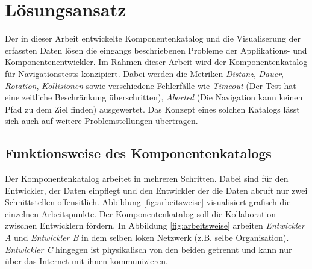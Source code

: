 \chapter{Lösungsansatz}
Der in dieser Arbeit entwickelte Komponentenkatalog und die Visualiserung der erfassten Daten lösen die eingangs beschriebenen Probleme der Applikations- und Komponentenentwickler. Im Rahmen dieser Arbeit wird der Komponentenkatalog für Navigationstests konzipiert. Dabei werden die Metriken \emph{Distanz}, \emph{Dauer}, \emph{Rotation}, \emph{Kollisionen} sowie verschiedene Fehlerfälle wie \emph{Timeout} (Der Test hat eine zeitliche Beschränkung überschritten), \emph{Aborted} (Die Navigation kann keinen Pfad zu dem Ziel finden) ausgewertet. Das Konzept eines solchen Katalogs lässt sich auch auf weitere Problemstellungen übertragen. 

\section{Funktionsweise des Komponentenkatalogs}
Der Komponentenkatalog arbeitet in mehreren Schritten. Dabei sind für den Entwickler, der Daten einpflegt und den Entwickler der die Daten abruft nur zwei Schnittstellen offensitlich. Abbildung \ref{fig:arbeitsweise} visualisiert grafisch die einzelnen Arbeitspunkte. Der Komponentenkatalog soll die Kollaboration zwischen Entwicklern fördern. In Abbildung \ref{fig:arbeitsweise} arbeiten \emph{Entwickler A} und \emph{Entwickler B} in dem selben loken Netzwerk (z.B. selbe Organisation). \emph{Entwickler C} hingegen ist physikalisch von den beiden getrennt und kann nur über das Internet mit ihnen kommunizieren.


